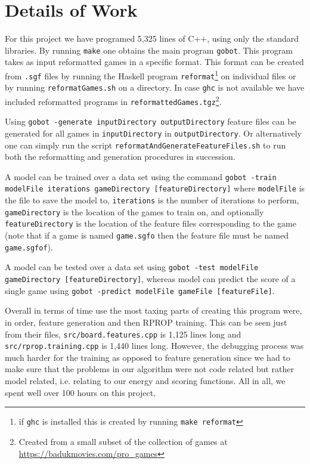 \documentclass[11pt,letterpaper]{article}
\begin{document}
\section{Details of Work}

For this project we have programed 5,325 lines of C++, using only the standard libraries. By running {\tt make}
one obtains the main program {\tt gobot}. This program takes as input reformatted games in a specific format.
This format can be created from {\tt *.sgf} files by running the Haskell program {\tt reformat}\footnote{if {\tt ghc} is
installed this is created by running {\tt make reformat}} on individual files or by running {\tt  reformatGames.sh} on
a directory. In case {\tt ghc} is not available we have included reformatted programs in
{\tt reformattedGames.tgz}\footnote{Created from a small subset of the collection of games at
\url{https://badukmovies.com/pro_games}}.

Using {\tt gobot -generate inputDirectory outputDirectory} feature files can be generated for all games in
{\tt inputDirectory} in {\tt outputDirectory}. Or alternatively one can simply run the script
{\tt reformatAndGenerateFeatureFiles.sh} to run both the reformatting and generation procedures in succession.

A model can be trained over a data set using the command
{\tt gobot -train modelFile iterations gameDirectory [featureDirectory]} where {\tt modelFile} is the file to save the
model to, {\tt iterations} is the number of iterations to perform, {\tt gameDirectory} is the location of the games to
train on, and optionally {\tt featureDirectory} is the location of the feature files corresponding to the game (note that
if a game is named {\tt game.sgfo} then the feature file must be named {\tt game.sgfof}).

A model can be tested over a data set using {\tt gobot -test modelFile gameDirectory [featureDirectory]}, whereas
model can predict the score of a single game using {\tt gobot -predict modelFile gameFile [featureFile]}.

Overall in terms of time use the most taxing parts of creating this program were, in order, feature generation and then
RPROP training. This can be seen just from their files, {\tt src/board.features.cpp} is 1,125 lines long and
{\tt src/rprop.training.cpp} is 1,440 lines long. However, the debugging process was much harder for the training as
opposed to feature generation since we had to make sure that the problems in our algorithm were not code related
but rather model related, i.e. relating to our energy and scoring functions. All in all, we spent well over 100 hours on
this project.
\end{document}
